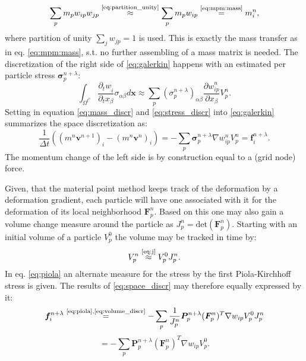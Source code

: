\documentclass[m,times]{cgMA}
\begin{document}
\begin{equation}\label{eq:mass_discr}
\sum _ {  { p } }  { m } _ {  { p } }  { w } _ {ip}   w_{jp}
\stackrel{\text{\ref{eq:partition_unity}}}{\approx}
\sum_p m_p w_{ip}
\stackrel{\text{\ref{eq:mpm:mass}}}{=}
m_i^n,
\end{equation}
where partition of unity $\sum_j w_{jp} = 1$ is used. This is exactly the mass transfer as in eq. \ref{eq:mpm:mass}, s.t. no further assembling of a mass matrix is needed.
The discretization of the right side of \ref{eq:galerkin} happens with an estimated per particle stress $\boldsymbol{\sigma}_p^{n+\lambda}$:
\begin{equation}\label{eq:stress_discr}
\int _ { \Omega ^ {  t^ n } }   \frac{\partial{_t w } _ { {i  }}}{\partial_tx_\beta }  \sigma _ {{ \alpha } \beta }  { d } \boldsymbol { x } \approx
\sum _ { p } (\sigma _ { p }^{n+\lambda}) _ { \alpha \beta } \frac{{ \partial w } _ { {ip}}^n}{ \partial x_\beta }  V _ { p } ^ { n }.
\end{equation}
Setting in equation \ref{eq:mass_discr} and \ref{eq:stress_discr} into \ref{eq:galerkin} summarizes the space discretization as:
\begin{equation}\label{eq:space_discr}
  \frac{1}{\Delta t} (({m^n\boldsymbol{v}^{n+1}})_i-({m^n\boldsymbol{v}^n})_i) =
  -\sum _ { p } \boldsymbol{\sigma} _ { p }^{n+\lambda} \nabla w_{ip}^n V _ { p } ^ { n }
  = \boldsymbol{f}_i^{n+\lambda}.
\end{equation}
The momentum change of the left side is by construction equal to a (grid node) force.

Given, that the material point method keeps track of the deformation by a deformation gradient, each particle will have one associated with it for the deformation of its local neighborhood $\boldsymbol{F}^n_p$. Based on this one may also gain a volume change measure around the particle as $J^n_p = \text{det}(\boldsymbol{F}^n_p)$. Starting with an initial volume of a particle $V_p^0$ the volume may be tracked in time by:
\begin{equation}\label{eq:volume_discr}
  V^n_p \stackrel{\text{\ref{eq:j}}}{\approx} V_p^0J^n_p.
\end{equation}
In eq. \ref{eq:piola} an alternate measure for the stress by the first Piola-Kirchhoff stress is given. The results of \ref{eq:space_discr} may therefore equally expressed by it:
$$
\boldsymbol{f}^{n+\lambda}_i \stackrel{\text{\ref{eq:piola},\ref{eq:volume_discr}}}{=}
- \sum_p \frac{1}{J^n_p}\boldsymbol{P}^{n+\lambda}_{p}(\boldsymbol{F}^{n}_{p})^T \nabla w_{ip}V^0_pJ^n_p
$$
\begin{equation}\label{eq:force_disc}
  = - \sum_p \boldsymbol{P}^{n+\lambda}_{p}(\boldsymbol{F}^{n}_{p})^T \nabla w_{ip}V^0_p.
\end{equation}
\begin{flushright}\cite{MPM:COURSE} \cite{MPM:APIC} \cite{bathe2006finite}\end{flushright}
\end{document}
